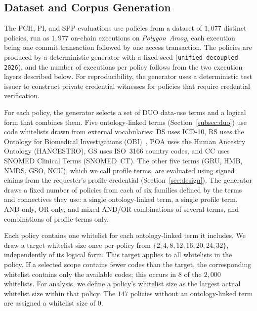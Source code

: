 \subsection{Dataset and Corpus Generation}
\label{sec:eval-dataset}

The PCH, PI, and SPP evaluations use policies from a dataset of $1{,}077$ distinct policies, run as $1{,}977$ on-chain executions on \emph{Polygon~Amoy}, each execution being one commit transaction followed by one access transaction.
The policies are produced by a deterministic generator with a fixed seed (\texttt{unified-decoupled-2026}), and the number of executions per policy follows from the two execution layers described below.
For reproducibility, the generator uses a deterministic test issuer to construct private credential witnesses for policies that require credential verification.

For each policy, the generator selects a set of DUO data-use terms and a logical form that combines them.
Five ontology-linked terms (Section~\ref{subsec:duo}) use code whitelists drawn from external vocabularies: DS uses ICD-10, RS uses the Ontology for Biomedical Investigations (OBI)~\cite{bandrowski2016ontology}, POA uses the Human Ancestry Ontology (HANCESTRO), GS uses ISO~3166 country codes, and CC uses SNOMED Clinical Terms (SNOMED~CT).
The other five terms (GRU, HMB, NMDS, GSO, NCU), which we call profile terms, are evaluated using signed claims from the requester's profile credential (Section~\ref{sec:design}).
The generator draws a fixed number of policies from each of six families defined by the terms and connectives they use: a single ontology-linked term, a single profile term, AND-only, OR-only, and mixed AND/OR combinations of several terms, and combinations of profile terms only.

Each policy contains one whitelist for each ontology-linked term it includes.
We draw a target whitelist size once per policy from $\{2, 4, 8, 12, 16, 20, 24, 32\}$, independently of its logical form.
This target applies to all whitelists in the policy.
If a selected scope contains fewer codes than the target, the corresponding whitelist contains only the available codes; this occurs in $8$ of the $2{,}000$ whitelists.
For analysis, we define a policy's whitelist size as the largest actual whitelist size within that policy.
The $147$ policies without an ontology-linked term are assigned a whitelist size of $0$.

